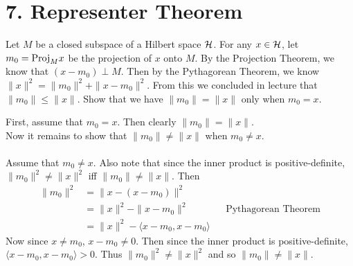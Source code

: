 \documentclass[12pt,letterpaper]{article}
\begin{document}
\section*{7. Representer Theorem}
\begin{problem}{7.1}
Let $M$ be a closed subspace of a Hilbert space $\mathcal{H}$. For any $x\in\mathcal{H}$,
let $m_{0}=\text{Proj}_{M}x$ be the projection of $x$ onto $M$. By the
Projection Theorem, we know that $(x-m_{0})\perp M$. Then by the
Pythagorean Theorem, we know $\|x\|^{2}=\|m_{0}\|^{2}+\|x-m_{0}\|^{2}$.
From this we concluded in lecture that $\|m_{0}\|\le\|x\|$. Show
that we have $\|m_{0}\|=\|x\|$ only when $m_{0}=x$.
\end{problem}
\begin{solution}{}
    First, assume that $m_0=x$. Then clearly $\|m_{0}\|=\|x\|$.\\
    Now it remains to show that $\|m_{0}\|\neq\|x\|$ when $m_0\neq x$.\\
    \\
    Assume that $m_0\neq x$. Also note that since the inner product is positive-definite,\\ $\|m_0\|^2 \neq \|x\|^2$ iff $\|m_0\| \neq \|x\|$.
    Then
    \begin{align*}
        \|m_0\|^2 &= \|x-(x-m_0)\|^2\\
        &= \|x\|^2 - \|x-m_0\|^2 && \text{Pythagorean Theorem}\\
        &= \|x\|^2 - \langle x-m_0,x-m_0\rangle
    \end{align*}
    Now since $x\neq m_0$, $x-m_0\neq 0$. Then since the inner product is positive-definite,\\ $\langle x-m_0,x-m_0\rangle > 0$.
    Thus $\|m_0\|^2 \neq \|x\|^2$ and so $\|m_0\| \neq \|x\|$.
\end{solution}
\newpage
\end{document}
